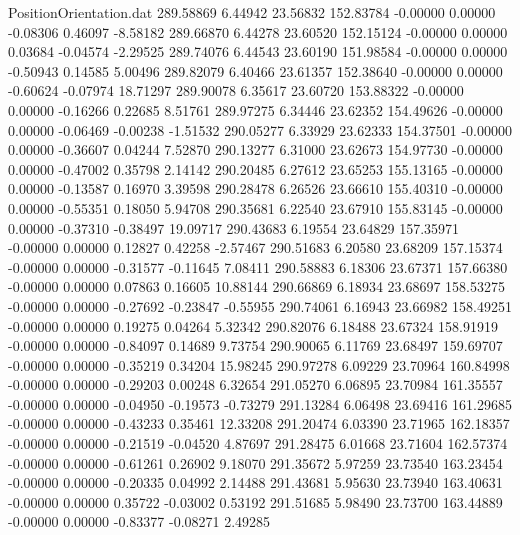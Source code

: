 \begin{filecontents}{PositionOrientation.dat}
 289.58869    6.44942   23.56832   152.83784   -0.00000    0.00000   -0.08306    0.46097   -8.58182
 289.66870    6.44278   23.60520   152.15124   -0.00000    0.00000    0.03684   -0.04574   -2.29525
 289.74076    6.44543   23.60190   151.98584   -0.00000    0.00000   -0.50943    0.14585    5.00496
 289.82079    6.40466   23.61357   152.38640   -0.00000    0.00000   -0.60624   -0.07974   18.71297
 289.90078    6.35617   23.60720   153.88322   -0.00000    0.00000   -0.16266    0.22685    8.51761
 289.97275    6.34446   23.62352   154.49626   -0.00000    0.00000   -0.06469   -0.00238   -1.51532
 290.05277    6.33929   23.62333   154.37501   -0.00000    0.00000   -0.36607    0.04244    7.52870
 290.13277    6.31000   23.62673   154.97730   -0.00000    0.00000   -0.47002    0.35798    2.14142
 290.20485    6.27612   23.65253   155.13165   -0.00000    0.00000   -0.13587    0.16970    3.39598
 290.28478    6.26526   23.66610   155.40310   -0.00000    0.00000   -0.55351    0.18050    5.94708
 290.35681    6.22540   23.67910   155.83145   -0.00000    0.00000   -0.37310   -0.38497   19.09717
 290.43683    6.19554   23.64829   157.35971   -0.00000    0.00000    0.12827    0.42258   -2.57467
 290.51683    6.20580   23.68209   157.15374   -0.00000    0.00000   -0.31577   -0.11645    7.08411
 290.58883    6.18306   23.67371   157.66380   -0.00000    0.00000    0.07863    0.16605   10.88144
 290.66869    6.18934   23.68697   158.53275   -0.00000    0.00000   -0.27692   -0.23847   -0.55955
 290.74061    6.16943   23.66982   158.49251   -0.00000    0.00000    0.19275    0.04264    5.32342
 290.82076    6.18488   23.67324   158.91919   -0.00000    0.00000   -0.84097    0.14689    9.73754
 290.90065    6.11769   23.68497   159.69707   -0.00000    0.00000   -0.35219    0.34204   15.98245
 290.97278    6.09229   23.70964   160.84998   -0.00000    0.00000   -0.29203    0.00248    6.32654
 291.05270    6.06895   23.70984   161.35557   -0.00000    0.00000   -0.04950   -0.19573   -0.73279
 291.13284    6.06498   23.69416   161.29685   -0.00000    0.00000   -0.43233    0.35461   12.33208
 291.20474    6.03390   23.71965   162.18357   -0.00000    0.00000   -0.21519   -0.04520    4.87697
 291.28475    6.01668   23.71604   162.57374   -0.00000    0.00000   -0.61261    0.26902    9.18070
 291.35672    5.97259   23.73540   163.23454   -0.00000    0.00000   -0.20335    0.04992    2.14488
 291.43681    5.95630   23.73940   163.40631   -0.00000    0.00000    0.35722   -0.03002    0.53192
 291.51685    5.98490   23.73700   163.44889   -0.00000    0.00000   -0.83377   -0.08271    2.49285

\end{filecontents}
